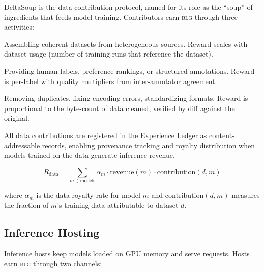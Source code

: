 \documentclass[11pt,letterpaper]{article}
\newcommand{\BLG}{\textsc{blg}}
\begin{document}
DeltaSoup is the data contribution protocol, named for its role as the ``soup'' of ingredients that feeds model training. Contributors earn \BLG{} through three activities:

\begin{description}[nosep]
    \item[Curation] Assembling coherent datasets from heterogeneous sources. Reward scales with dataset usage (number of training runs that reference the dataset).
    \item[Labeling/Annotation] Providing human labels, preference rankings, or structured annotations. Reward is per-label with quality multipliers from inter-annotator agreement.
    \item[Cleaning/Deduplication] Removing duplicates, fixing encoding errors, standardizing formats. Reward is proportional to the byte-count of data cleaned, verified by diff against the original.
\end{description}

All data contributions are registered in the Experience Ledger \cite{zoo-experience-ledger} as content-addressable records, enabling provenance tracking and royalty distribution when models trained on the data generate inference revenue.

\begin{equation}
R_{\text{data}} = \sum_{m \in \text{models}} \alpha_m \cdot \text{revenue}(m) \cdot \text{contribution}(d, m)
\end{equation}

where $\alpha_m$ is the data royalty rate for model $m$ and $\text{contribution}(d, m)$ measures the fraction of $m$'s training data attributable to dataset $d$.

\subsection{Inference Hosting}

Inference hosts keep models loaded on GPU memory and serve requests. Hosts earn \BLG{} through two channels:
\end{document}
